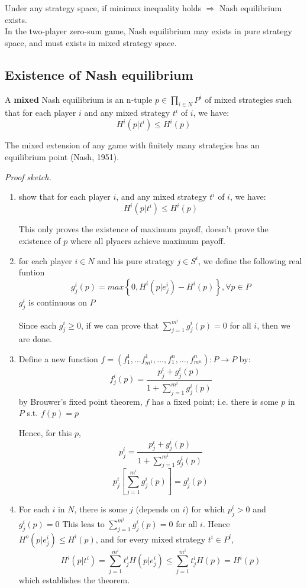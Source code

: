 \documentclass[11pt,a4paper]{article}
\newcommand{\note}[1]{%
    \begin{tcolorbox}[title=\textbf{Note},fonttitle=\bfseries,coltitle=textgray]
        #1
    \end{tcolorbox}
}
\begin{document}
\note{
Under any strategy space, if minimax inequality holds $\Rightarrow$ Nash equilibrium exists. \\
In the two-player zero-sum game, Nash equilibrium may exists in pure strategy space, and must exists in mixed strategy space.}

\subsection{Existence of Nash equilibrium}
A \textbf{mixed} Nash equilibrium is an n-tuple $p \in \prod_{i \in N} P^i$ of mixed strategies such that for each player $i$ and any mixed strategy $t^i$ of $i$, we have:
\[
H^i(p|t^i) \leqslant H^i(p)
\]

The mixed extension of any game with finitely many strategies has an equilibrium point (Nash, 1951). \par
\textit{Proof sketch.}
\begin{enumerate}
    \item [(1)] show that for each player $i$, and any mixed strategy $t^i$ of $i$, we have:
        \[
        H^i(p|t^i) \leqslant H^i(p)
        \]

        \note{
        This only proves the existence of maximum payoff, doesn't prove the existence of $p$ where all plyaers achieve maximum payoff.}

    \item [(2)]
        for each player $i \in N$ and his pure strategy $j \in S^i$, we define the following real funtion
        \[
        g_j^i(p) = max\left\{0, H^i(p|e_j^i) - H^i(p)\right\}, \forall p \in P
        \]
        $g_j^i$ is continuous on $P$ \par
        Since each $g_j^i \geqslant 0$, if we can prove that $\sum_{j=1}^{m^i} g_j^i(p) = 0$ for all $i$, then we are done. \par
    
    \item [(3)]
        Define a new function $f = (f_1^1, \dots f_{m^1}^1, \dots, f_1^n, \dots, f_{m^n}^n) : P \rightarrow P$ by:
        \[
        f_j^i(p) = \frac{p_j^i + g_j^i(p)}{1 + \sum_{j=1}^{m^i} g_j^i(p)}
        \]
        by Brouwer's fixed point theorem, $f$ has a fixed point; i.e. there is some $p$ in $P$ s.t. $f(p) = p$ \par
        Hence, for this $p$,
        \[
        p_j^i = \frac{p_j^i + g_j^i(p)}{1 + \sum_{j=1}^{m^i} g_j^i(p)}
        \]
        \[
        p_j^i \left[\sum_{j=1}^{m^i} g_j^i(p) \right] = g_j^i(p)
        \]

    \item [(4)]
        For each $i$ in $N$, there is some $j$ (depends on $i$) for which $p_j^i > 0$ and $g_j^i(p) = 0$
        This leas to $\sum_{j=1}^{m^i} g_j^i(p) = 0$ for all $i$.
        Hence $H^o(p|e_j^i) \leqslant H^i(p)$, and for every mixed strategy $t^i \in P^i$,
        \[
        H^i(p|t^i) = \sum_{j=1}^{m^i} t_j^i H(p|e_j^i) \leqslant \sum_{j=1}^{m^i} t_j^i H(p) = H^i(p)
        \]
        which establishes the theorem.
    
\end{enumerate}
\end{document}

